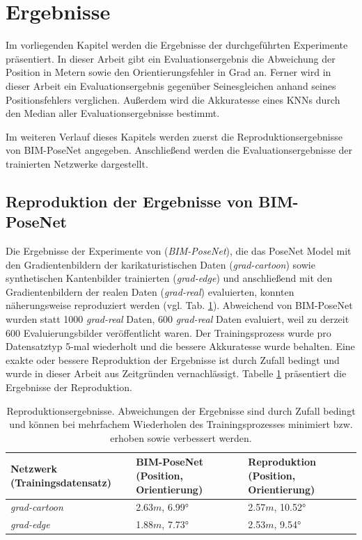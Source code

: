 
\section{Ergebnisse}
Im vorliegenden Kapitel werden die Ergebnisse der durchgeführten Experimente präsentiert. In dieser Arbeit gibt ein Evaluationsergebnis die Abweichung der Position in Metern sowie den Orientierungsfehler in Grad an. Ferner wird in dieser Arbeit ein Evaluationsergebnis gegenüber Seinesgleichen anhand seines Positionsfehlers verglichen. Außerdem wird die Akkuratesse eines KNNs durch den Median aller Evaluationsergebnisse bestimmt.

Im weiteren Verlauf dieses Kapitels werden zuerst die Reproduktionsergebnisse von BIM-PoseNet \cite{acharyaBIMPoseNetIndoorCamera2019} angegeben. Anschließend werden die Evaluationsergebnisse der trainierten Netzwerke dargestellt.

\subsection{Reproduktion der Ergebnisse von BIM-PoseNet}
Die Ergebnisse der Experimente von \citet{acharyaBIMPoseNetIndoorCamera2019} (\textit{BIM-PoseNet}), die das PoseNet Model mit den Gradientenbildern der karikaturistischen Daten (\textit{grad-cartoon}) sowie synthetischen Kantenbilder trainierten (\textit{grad-edge}) und anschließend mit den Gradientenbildern der realen Daten (\textit{grad-real}) evaluierten, konnten näherungsweise reproduziert werden (vgl. Tab. \ref{tab:reproduction}). Abweichend von BIM-PoseNet wurden statt 1000 \textit{grad-real} Daten, 600 \textit{grad-real} Daten evaluiert, weil zu derzeit 600 Evaluierungsbilder veröffentlicht waren. Der Trainingsprozess wurde pro Datensatztyp 5-mal wiederholt und die bessere Akkuratesse wurde behalten. Eine exakte oder bessere Reproduktion der Ergebnisse ist durch Zufall bedingt und wurde in dieser Arbeit aus Zeitgründen vernachlässigt. Tabelle \ref{tab:reproduction} präsentiert die Ergebnisse der Reproduktion.


\begin{table}[b]
	\centering
	\caption{Reproduktionsergebnisse. Abweichungen der Ergebnisse sind durch Zufall bedingt und können bei mehrfachem Wiederholen des Trainingsprozesses minimiert bzw. erhoben sowie verbessert werden. }
	\begin{tabularx}{1.0\textwidth}{X X X}
		\textbf{Netzwerk} \hspace{2cm} (Trainingsdatensatz) & \textbf{BIM-PoseNet} \hspace{2cm} (Position, Orientierung) & \textbf{Reproduktion} \hspace{2cm} (Position, Orientierung)\\
		\hline
	 \textit{grad-cartoon} & 2.63$m$, 6.99° & 2.57$m$, 10.52°\\
		\hline
		\textit{grad-edge} & 1.88$m$, 7.73°  & 2.53$m$, 9.54°\\
	\end{tabularx}
	\label{tab:reproduction}
\end{table}





